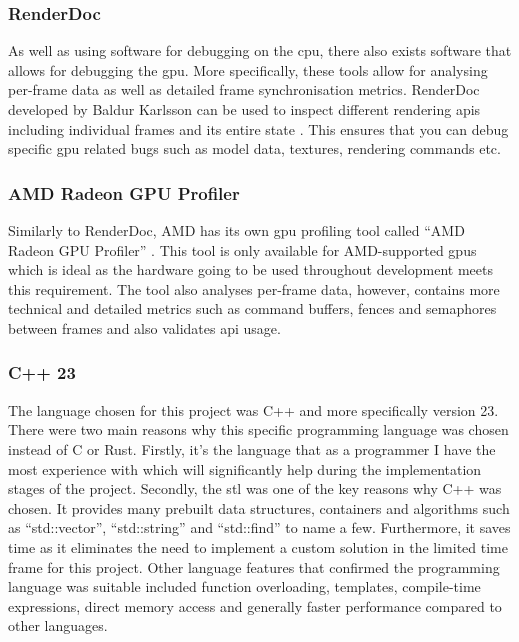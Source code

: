 \documentclass[11pt]{article}
\begin{document}
\subsubsection{RenderDoc}
As well as using software for debugging on the \gls*{cpu}, there also exists
software that allows for debugging the \gls*{gpu}. More specifically, these
tools allow for analysing per-frame data as well as detailed frame
synchronisation metrics. RenderDoc developed by Baldur Karlsson can be used to
inspect different rendering \glspl*{api} including individual frames and its
entire state \cite{renderdoc}. This ensures that you can debug specific
\gls*{gpu} related bugs such as model data, textures, rendering commands etc.

\subsubsection{AMD Radeon GPU Profiler}
Similarly to RenderDoc, AMD has its own \gls*{gpu} profiling tool called ``AMD
Radeon GPU Profiler'' \cite{rgp}. This tool is only available for AMD-supported
\glspl*{gpu} which is ideal as the hardware going to be used throughout
development meets this requirement. The tool also analyses per-frame data,
however, contains more technical and detailed metrics such as command buffers,
fences and semaphores between frames and also validates \gls*{api} usage.



\subsubsection{C++ 23}
The language chosen for this project was C++ and more specifically version 23.
There were two main reasons why this specific programming language was chosen
instead of C or Rust. Firstly, it's the language that as a programmer I have the
most experience with which will significantly help during the implementation
stages of the project. Secondly, the \gls*{stl} was one of the key reasons why
C++ was chosen. It provides many prebuilt data structures, containers and
algorithms such as ``std::vector'', ``std::string'' and ``std::find'' to name a
few. Furthermore, it saves time as it eliminates the need to implement a custom
solution in the limited time frame for this project. Other language features
that confirmed the programming language was suitable included function
overloading, templates, compile-time expressions, direct memory access and
generally faster performance compared to other languages.
\end{document}
